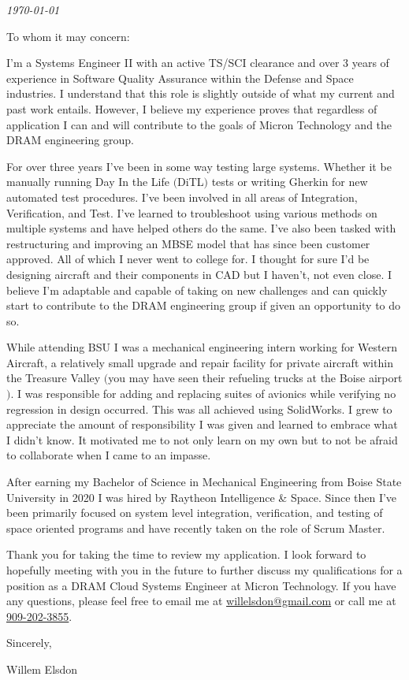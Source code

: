 \documentclass{ExpressiveCoverLetter}
\begin{document}
\coverletterheader[
    firstname=Willem,
    middleinitial=N,
    lastname=Elsdon,
    email=willelsdon@gmail.com,
    phone=909-202-3855,
    linkedin=willem-elsdon,
    github=welsdon,
    city=Boise,
    state=Idaho
]

\vspace{0.05in}
\emph{\today}
\vspace{0.15in}


To whom it may concern:

I'm a Systems Engineer II with an active TS/SCI clearance and over 3 years of experience in Software
Quality Assurance within the Defense and Space industries. I understand that this
role is slightly outside of what my current and past work entails. However, I
believe my experience proves that regardless of application I can and will contribute to
the goals of Micron Technology and the DRAM engineering group.

For over three years I've been in some way testing large systems.
Whether it be manually running Day In the Life $($DiTL$)$ tests or
writing Gherkin for new automated test procedures. I've been involved in
all areas of Integration, Verification, and Test. I've learned to
troubleshoot using various methods on multiple systems and have helped
others do the same. I've also been tasked with restructuring and
improving an MBSE model that has since been customer approved. All of which I never went to college for. I thought
for sure I'd be designing aircraft and their components in CAD but I
haven't, not even close. I believe I'm adaptable and capable of
taking on new challenges and can quickly start to contribute to the DRAM
engineering group if given an opportunity to do so.

While attending BSU I was a mechanical engineering intern working for
Western Aircraft, a relatively small upgrade and repair facility for
private aircraft within the Treasure Valley $($you may have seen their
refueling trucks at the Boise airport$)$. I was responsible for
adding and replacing suites of avionics while verifying no regression in
design occurred. This was all achieved using SolidWorks. I grew to
appreciate the amount of responsibility I was given and learned to
embrace what I didn't know. It motivated me to not only learn on my own
but to not be afraid to collaborate when I came to an impasse.

After earning my Bachelor of Science in Mechanical Engineering from
Boise State University in 2020 I was hired by Raytheon Intelligence \&
Space. Since then I've been primarily focused
on system level integration, verification, and testing of space oriented programs
and have recently taken on the role of Scrum Master.

Thank you for taking the time to review my application. I look forward
to hopefully meeting with you in the future to further discuss my
qualifications for a position as a DRAM Cloud Systems Engineer at Micron Technology.
If you have any questions, please feel free to
email me at \href{mailto:willelsdon@gmail.com}{willelsdon@gmail.com} or
call me at \href{tel:+1-909-202-3855}{909-202-3855}.

Sincerely,

\vspace{0.05in}

Willem Elsdon
\end{document}
